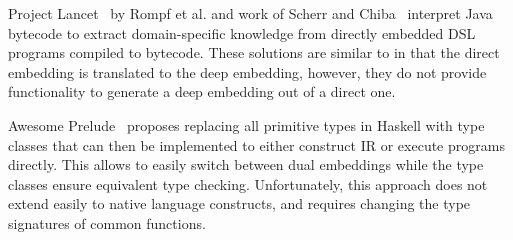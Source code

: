 Project Lancet~\cite{lancet} by Rompf et al. and work of Scherr and
Chiba~\cite{scherr_ecoop_2014} interpret Java bytecode to extract
domain-specific knowledge from directly embedded
DSL programs compiled to bytecode. These solutions are similar to \yy
in that the direct embedding is translated to the deep
embedding, however, they do not provide functionality to
generate a deep embedding out of a direct one.

Awesome Prelude~\cite{awesome} proposes replacing all primitive types
in Haskell with type classes that can then be implemented to either
construct IR or execute programs directly. This allows to easily
switch between dual embeddings while the type classes ensure
equivalent type checking.  Unfortunately, this approach does not
extend easily to native language constructs, and requires changing the
type signatures of common functions.

